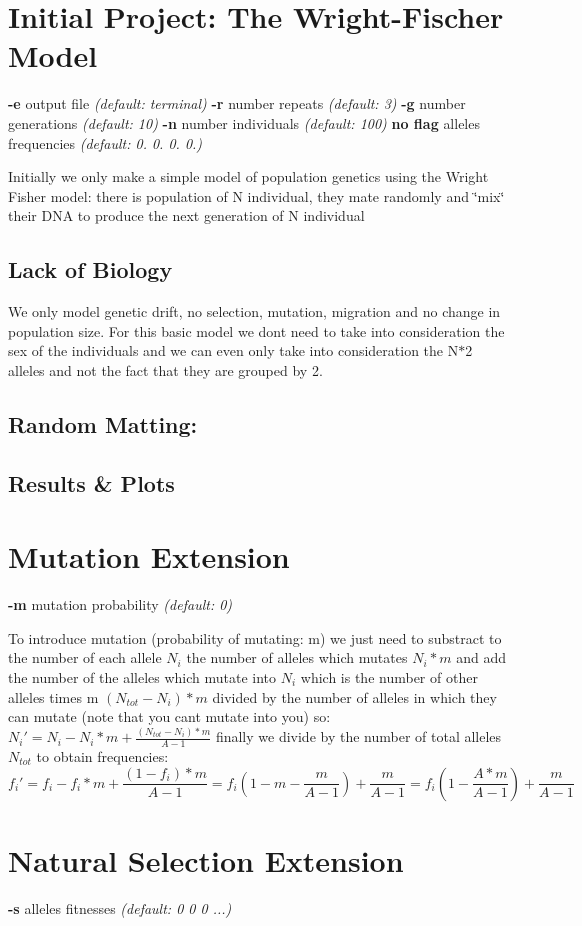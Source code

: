 \hypertarget{index_initial_sec}{}\section{Initial Project\+: The Wright-\/\+Fischer Model}\label{index_initial_sec}
{\bfseries -\/e} output file {\itshape  (default\+: terminal)} {\bfseries -\/r} number repeats {\itshape  (default\+: 3)} {\bfseries -\/g} number generations {\itshape  (default\+: 10)} {\bfseries -\/n} number individuals {\itshape  (default\+: 100)} {\bfseries  no flag } alleles frequencies {\itshape  (default\+: 0. 0. 0. 0.)}

Initially we only make a simple model of population genetics using the Wright Fisher model\+: there is population of N individual, they mate randomly and \char`\"{}mix\char`\"{} their D\+NA to produce the next generation of N individual \hypertarget{index_lackBiology}{}\subsection{Lack of Biology}\label{index_lackBiology}
We only model genetic drift, no selection, mutation, migration and no change in population size. For this basic model we don\textquotesingle{}t need to take into consideration the sex of the individuals and we can even only take into consideration the N$\ast$2 alleles and not the fact that they are grouped by 2. \hypertarget{index_randomMatting}{}\subsection{Random Matting\+:}\label{index_randomMatting}
 \hypertarget{index_results}{}\subsection{Results \& Plots}\label{index_results}
  \hypertarget{index_mutation_sec}{}\section{Mutation Extension}\label{index_mutation_sec}
{\bfseries -\/m} mutation probability {\itshape  (default\+: 0)}

To introduce mutation (probability of mutating\+: m) we just need to substract to the number of each allele $ N_i $ the number of alleles which mutates $ N_i*m $ and add the number of the alleles which mutate into $ N_i $ which is the number of other alleles times m $ (N_{tot}-N_i)*m $ divided by the number of alleles in which they can mutate (note that you can\textquotesingle{}t mutate into you) so\+: $ N_i'= N_i - N_i*m +\frac{(N_{tot}-N_i)*m}{A-1} $ finally we divide by the number of total alleles $ N_{tot} $ to obtain frequencies\+: \[ f_i'= f_i - f_i*m +\frac{(1-f_i)*m}{A-1}= f_i(1-m-\frac{m}{A-1}) + \frac{m}{A-1} = f_i(1-\frac{A*m}{A-1}) + \frac{m}{A-1} \] \hypertarget{index_selection_sec}{}\section{Natural Selection Extension}\label{index_selection_sec}
{\bfseries -\/s} alleles fitnesses {\itshape  (default\+: 0 0 0 ...)}

